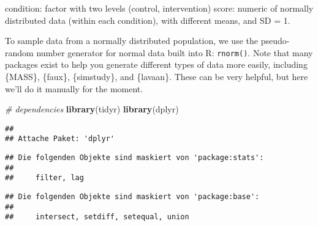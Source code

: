 \documentclass[
]{article}
\newenvironment{Shaded}{\begin{snugshade}}{\end{snugshade}}
\newcommand{\CommentTok}[1]{\textcolor[rgb]{0.56,0.35,0.01}{\textit{#1}}}
\newcommand{\FunctionTok}[1]{\textcolor[rgb]{0.13,0.29,0.53}{\textbf{#1}}}
\newcommand{\NormalTok}[1]{#1}
\begin{document}
condition: factor with two levels (control, intervention) score: numeric
of normally distributed data (within each condition), with different
means, and SD = 1.

To sample data from a normally distributed population, we use the
pseudo-random number generator for normal data built into R:
\texttt{rnorm()}. Note that many packages exist to help you generate
different types of data more easily, including \{MASS\}, \{faux\},
\{simstudy\}, and \{lavaan\}. These can be very helpful, but here we'll
do it manually for the moment.

\begin{Shaded}
\begin{Highlighting}[]
\CommentTok{\# dependencies}
\FunctionTok{library}\NormalTok{(tidyr)}
\FunctionTok{library}\NormalTok{(dplyr)}
\end{Highlighting}
\end{Shaded}

\begin{verbatim}
## 
## Attache Paket: 'dplyr'
\end{verbatim}

\begin{verbatim}
## Die folgenden Objekte sind maskiert von 'package:stats':
## 
##     filter, lag
\end{verbatim}

\begin{verbatim}
## Die folgenden Objekte sind maskiert von 'package:base':
## 
##     intersect, setdiff, setequal, union
\end{verbatim}
\end{document}
